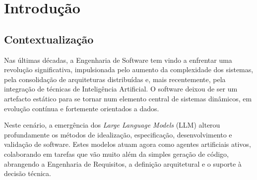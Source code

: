 \documentclass[a4paper,12pt]{scrreprt}
\begin{document}
\pagebreak



\renewcommand{\contentsname}{Índice}

\tableofcontents

\pagebreak

\listoffigures

\pagebreak

\listoftables

\pagebreak





\chapter{Introdução}
    \section{Contextualização}
        Nas últimas décadas, a Engenharia de Software tem vindo a enfrentar uma revolução significativa, impulsionada pelo aumento da complexidade dos sistemas, pela consolidação de arquiteturas distribuídas e, mais recentemente, pela integração de técnicas de Inteligência Artificial. O software deixou de ser um artefacto estático para se tornar num elemento central de sistemas dinâmicos, em evolução contínua e fortemente orientados a dados.
        
        Neste cenário, a emergência dos \textit{Large Language Models} (LLM) alterou profundamente os métodos de idealização, especificação, desenvolvimento e validação de software. Estes modelos atuam agora como agentes artificiais ativos, colaborando em tarefas que vão muito além da simples geração de código, abrangendo a Engenharia de Requisitos, a definição arquitetural e o suporte à decisão técnica.
        
\end{document}
